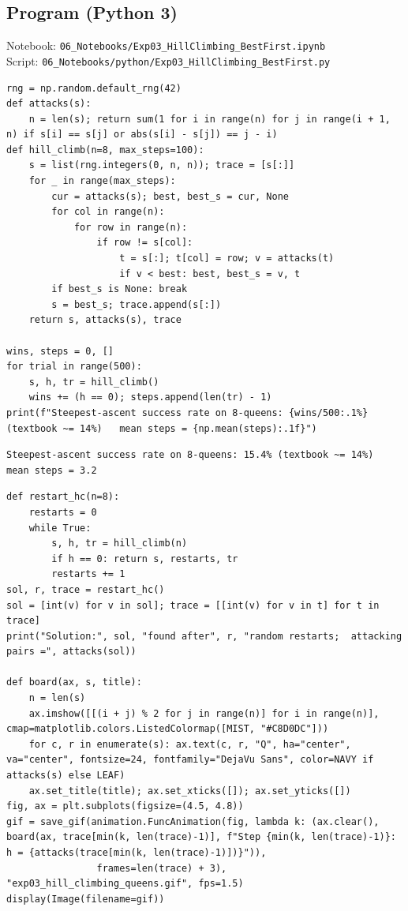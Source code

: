 \documentclass[11pt]{article}
\begin{document}
\subsection*{Program (Python 3)}
{\small\color{slate}Notebook: \texttt{06\_Notebooks/Exp03\_HillClimbing\_BestFirst.ipynb}\\ Script: \texttt{06\_Notebooks/python/Exp03\_HillClimbing\_BestFirst.py}}
\begin{lstlisting}[style=py]
rng = np.random.default_rng(42)
def attacks(s):
    n = len(s); return sum(1 for i in range(n) for j in range(i + 1, n) if s[i] == s[j] or abs(s[i] - s[j]) == j - i)
def hill_climb(n=8, max_steps=100):
    s = list(rng.integers(0, n, n)); trace = [s[:]]
    for _ in range(max_steps):
        cur = attacks(s); best, best_s = cur, None
        for col in range(n):
            for row in range(n):
                if row != s[col]:
                    t = s[:]; t[col] = row; v = attacks(t)
                    if v < best: best, best_s = v, t
        if best_s is None: break
        s = best_s; trace.append(s[:])
    return s, attacks(s), trace

wins, steps = 0, []
for trial in range(500):
    s, h, tr = hill_climb()
    wins += (h == 0); steps.append(len(tr) - 1)
print(f"Steepest-ascent success rate on 8-queens: {wins/500:.1%} (textbook ~= 14%)   mean steps = {np.mean(steps):.1f}")
\end{lstlisting}
\begin{lstlisting}[style=out]
Steepest-ascent success rate on 8-queens: 15.4% (textbook ~= 14%)   mean steps = 3.2
\end{lstlisting}
\begin{lstlisting}[style=py]
def restart_hc(n=8):
    restarts = 0
    while True:
        s, h, tr = hill_climb(n)
        if h == 0: return s, restarts, tr
        restarts += 1
sol, r, trace = restart_hc()
sol = [int(v) for v in sol]; trace = [[int(v) for v in t] for t in trace]
print("Solution:", sol, "found after", r, "random restarts;  attacking pairs =", attacks(sol))

def board(ax, s, title):
    n = len(s)
    ax.imshow([[(i + j) % 2 for j in range(n)] for i in range(n)], cmap=matplotlib.colors.ListedColormap([MIST, "#C8D0DC"]))
    for c, r in enumerate(s): ax.text(c, r, "Q", ha="center", va="center", fontsize=24, fontfamily="DejaVu Sans", color=NAVY if attacks(s) else LEAF)
    ax.set_title(title); ax.set_xticks([]); ax.set_yticks([])
fig, ax = plt.subplots(figsize=(4.5, 4.8))
gif = save_gif(animation.FuncAnimation(fig, lambda k: (ax.clear(), board(ax, trace[min(k, len(trace)-1)], f"Step {min(k, len(trace)-1)}: h = {attacks(trace[min(k, len(trace)-1)])}")),
                frames=len(trace) + 3), "exp03_hill_climbing_queens.gif", fps=1.5)
display(Image(filename=gif))
\end{lstlisting}
\end{document}
